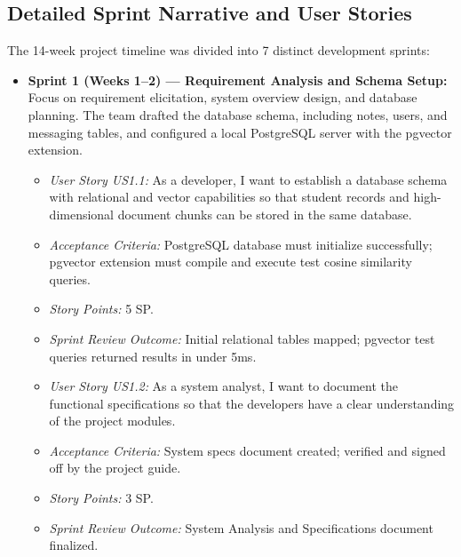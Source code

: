 \documentclass[12,Times new Roman,a4paper]{report}
\begin{document}
\subsection{Detailed Sprint Narrative and User Stories}
The 14-week project timeline was divided into 7 distinct development sprints:
\begin{itemize}
    \item \textbf{Sprint 1 (Weeks 1--2) --- Requirement Analysis and Schema Setup:} Focus on requirement elicitation, system overview design, and database planning. The team drafted the database schema, including notes, users, and messaging tables, and configured a local PostgreSQL server with the pgvector extension.
    \begin{itemize}
        \item \textit{User Story US1.1:} As a developer, I want to establish a database schema with relational and vector capabilities so that student records and high-dimensional document chunks can be stored in the same database.
        \item \textit{Acceptance Criteria:} PostgreSQL database must initialize successfully; pgvector extension must compile and execute test cosine similarity queries.
        \item \textit{Story Points:} 5 SP.
        \item \textit{Sprint Review Outcome:} Initial relational tables mapped; pgvector test queries returned results in under 5ms.
    \end{itemize}
    \begin{itemize}
        \item \textit{User Story US1.2:} As a system analyst, I want to document the functional specifications so that the developers have a clear understanding of the project modules.
        \item \textit{Acceptance Criteria:} System specs document created; verified and signed off by the project guide.
        \item \textit{Story Points:} 3 SP.
        \item \textit{Sprint Review Outcome:} System Analysis and Specifications document finalized.
    \end{itemize}
    

\end{itemize}
\end{document}
